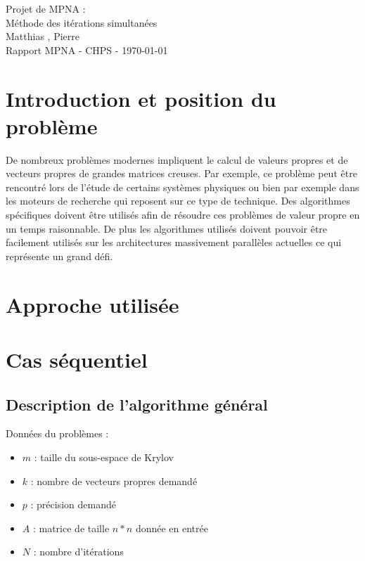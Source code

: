 \documentclass[11pt,a4paper]{article}
\begin{document}
\begin{center}

	{\LARGE\centering Projet de MPNA :\\ Méthode des itérations simultanées}\\[1cm]

	{ Matthias , Pierre }\\[0.5cm]
	{Rapport MPNA - CHPS - \today}
\end{center}

\tableofcontents

\section{Introduction et position du problème}
	De nombreux problèmes modernes impliquent le calcul de valeurs propres et de vecteurs propres de grandes matrices creuses. Par exemple, ce problème peut être rencontré lors de l'étude de certains systèmes physiques ou bien par exemple dans les moteurs de recherche qui reposent sur ce type de technique. Des algorithmes spécifiques doivent être utilisés afin de résoudre ces problèmes de valeur propre en un temps raisonnable. De plus les algorithmes utilisés doivent pouvoir être facilement utilisés sur les architectures massivement parallèles actuelles ce qui représente un grand défi.

\section{Approche utilisée}

\section{Cas séquentiel}

	\subsection{Description de l'algorithme général}

		Données du problèmes :

		\begin{itemize}
			\item $m$ : taille du sous-espace de Krylov
			\item $k$ : nombre de vecteurs propres demandé
			\item $p$ : précision demandé
			\item $A$ : matrice de taille $n*n$ donnée en entrée
			\item $N$ : nombre d'itérations
		\end{itemize}
\end{document}
